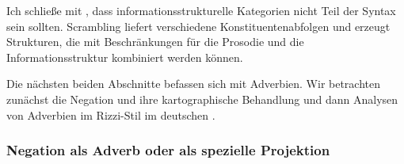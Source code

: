 Ich schließe mit \citet{Fanselow2006a}, dass informationsstrukturelle Kategorien nicht Teil
der Syntax sein sollten. Scrambling liefert verschiedene Konstituentenabfolgen und erzeugt Strukturen, die mit
Beschränkungen für die Prosodie und die Informationsstruktur kombiniert werden können.

Die nächsten beiden Abschnitte befassen sich mit Adverbien. Wir betrachten zunächst die Negation und ihre kartographische Behandlung
und dann Analysen von Adverbien im Rizzi-Stil im deutschen \mf.


\subsubsection{Negation als Adverb oder als spezielle Projektion}
\label{sec-NegP}

